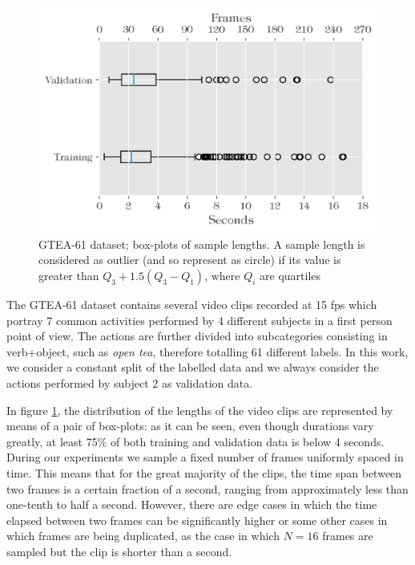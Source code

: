 \documentclass[10pt,twocolumn,letterpaper]{article}
\begin{document}
\begin{figure}
	\begin{center}
		\includegraphics[width=\linewidth]{grafici/GTEA61_boxplot.png}		
	\end{center}
	\caption{GTEA-61 dataset; box-plots of sample lengths. A sample length is considered as outlier (and so represent as circle) if its value is greater than $Q_3 + 1.5(Q_3-Q_1)$, where $Q_i$ are quartiles}
	\label{fig:GTEA61_boxplot}
\end{figure}

The GTEA-61 dataset contains several video clips recorded at 15 fps which portray 7 common activities performed by 4 different subjects in a first person point of view. The actions are further divided into subcategories consisting in verb+object, such as \textit{open tea}, therefore totalling 61 different labels. In this work, we consider a constant split of the labelled data and we always consider the actions performed by subject 2 as validation data.

In figure \ref{fig:GTEA61_boxplot}, the distribution of the lengths of the video clips are represented by means of a pair of box-plots: as it can be seen, even though durations vary greatly, at least 75\% of both training and validation data is below 4 seconds. During our experiments we sample a fixed number of frames uniformly spaced in time. This means that for the great majority of the clips, the time span between two frames is a certain fraction of a second, ranging from approximately less than one-tenth to half a second. However, there are edge cases in which the time elapsed between two frames can be significantly higher or some other cases in which frames are being duplicated, as the case in which $N = 16$ frames are sampled but the clip is shorter than a second.
\end{document}
